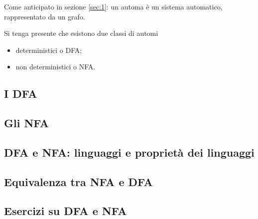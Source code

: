 \documentclass{subfiles}
\begin{document}
Come anticipato in sezione \eqref{sec:1}: un automa è un sistema automatico, rappresentato da un grafo.

\noindent Si tenga presente che esistono due classi di automi
\begin{itemize}
    \item deterministici o DFA;
    \item non deterministici o NFA.
\end{itemize}

\subsection{I DFA}


\subsection{Gli NFA}


\subsection{DFA e NFA: linguaggi e proprietà dei linguaggi}


\subsection{Equivalenza tra NFA e DFA}


\subsection{Esercizi su DFA e NFA}

\end{document}
